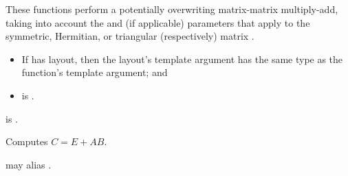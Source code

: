 \begin{itemdescr}
\pnum
These functions perform
a potentially overwriting matrix-matrix multiply-add,
taking into account the  and  (if applicable) parameters
that apply to the symmetric, Hermitian, or triangular (respectively) matrix .

\pnum
\mandates
\begin{itemize}
\item
If  has  layout, then the
      layout's  template argument has the same type as
      the function's  template argument; and
\item
{} is .
\end{itemize}

\pnum
\expects
{} is .

\pnum
\effects
Computes $C = E + A B$.

\pnum
\remarks
{} may alias .
\end{itemdescr}

